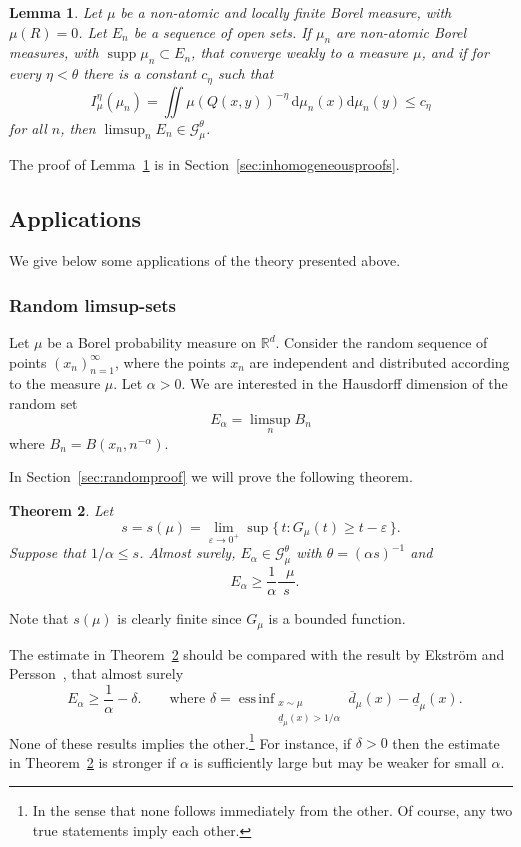 \documentclass[11pt]{article}
\newtheorem{theo}{Theorem}[section]
\newtheorem{lemm}[theo]{Lemma}
\theoremstyle{definition}
\numberwithin{equation}{section}
\numberwithin{figure}{section}
\numberwithin{table}{section}
\DeclareMathOperator{\dimh}{dim_H}
\DeclareMathOperator{\udimh}{\overline{dim}_H}
\DeclareMathOperator{\supp}{supp}
\DeclareMathOperator*{\essinf}{ess\,inf}
\newcommand*{\dd}{\mathrm{d}}
\begin{document}
\begin{lemm}\label{lem:frostman}
Let $\mu$ be a non-atomic and locally finite Borel measure, with $\mu (R) = 0$. Let $E_n$ be a sequence of open sets. If $\mu_n$ are non-atomic Borel measures, with $\supp \mu_n \subset E_n$, that converge weakly to a measure $\mu$, and if for every $\eta < \theta$ there is a constant $c_\eta$ such that
\[
I_\mu^\eta (\mu_n) = \iint \mu (Q(x,y))^{-\eta} \, \dd \mu_n (x) \dd \mu_n (y) \leq c_\eta
\]
for all $n$, then $\limsup_n E_n \in \mathscr{G}_\mu^\theta$.
\end{lemm}

The proof of Lemma~\ref{lem:frostman} is in Section~\ref{sec:inhomogeneousproofs}.

\subsection{Applications} \label{sec:applications}

We give below some applications of the theory presented above.

\subsubsection{Random limsup-sets} \label{sec:random}

Let $\mu$ be a Borel probability measure on $\mathbb{R}^d$. Consider the random sequence of points $(x_n)_{n=1}^\infty$, where the points $x_n$ are independent and distributed according to the measure $\mu$. Let $\alpha > 0$. We are interested in the Hausdorff dimension of the random set
\[
E_\alpha = \limsup_n B_n
\]
where $B_n = B(x_n,n^{-\alpha})$.

In Section~\ref{sec:randomproof} we will prove the following theorem.

\begin{theo}\label{the:randomlimsup}
Let
\[
s = s (\mu) = \lim_{\varepsilon \to 0^+} \sup \{\, t : G_\mu (t)
\geq t - \varepsilon \,\}.
\]
Suppose that $1/\alpha \leq s$. Almost surely, $E_\alpha \in
\mathscr{G}_\mu^\theta$ with $\theta = (\alpha s)^{-1}$ and
\[
\dimh E_\alpha \geq \frac{1}{\alpha} \frac{\udimh \mu}{s}.
\]
\end{theo}

Note that $s (\mu)$ is clearly finite since $G_\mu$ is a bounded function.

The estimate in Theorem~\ref{the:randomlimsup} should be compared with the result by Ekstr\"om and Persson~\cite[Theorem~1]{ekstrompersson}, that almost surely
\[
\dimh E_\alpha \geq \frac{1}{\alpha} - \delta. \qquad \text{where }
\delta = \essinf_{\substack{x \sim \mu \\ \underline{d}_\mu (x) > 1 /
\alpha}} \overline{d}_\mu (x) - \underline{d}_\mu (x).
\]
None of these results implies the other.\footnote{In the sense that none follows immediately from the other. Of course, any two true statements imply each other.} For instance, if $\delta > 0$ then the estimate in Theorem~\ref{the:randomlimsup} is stronger if $\alpha$ is sufficiently large but may be weaker for small $\alpha$.
\end{document}
